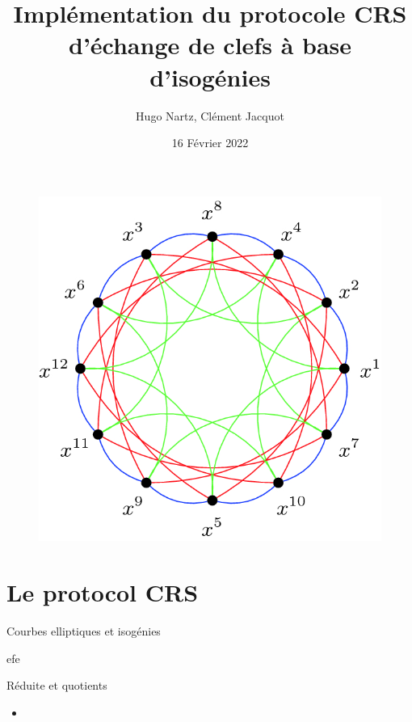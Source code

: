 \documentclass{beamer}
\title{Implémentation du protocole CRS d'échange de clefs à base d'isogénies }
\author{Hugo Nartz, Cl\'ement Jacquot}
\date{16 F\'evrier 2022}
\begin{document}
\begin{frame}
  \titlepage
\begin{figure}[h]
\centering
\includegraphics[scale=0.5]{../figs/isoGraph}
\end{figure}
\end{frame}

\begin{frame}{}
  \tableofcontents
\end{frame}

\section{Le protocol CRS}
\begin{frame}{Courbes elliptiques et isog\'enies}
	\begin{thm}
		efe
	\end{thm}
\end{frame}

\begin{frame}{Réduite et quotients}
\begin{itemize}
    \item{}
\end{itemize}
\end{frame}
\end{document}

